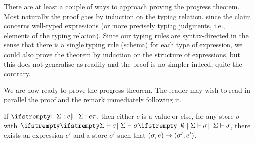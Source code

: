 There are at least a couple of ways to approach proving the progress theorem. Most naturally the proof goes by induction on the typing relation, since the claim concerns well-typed expressions (or more precisely typing judgments, i.e., elements of the typing relation). Since our typing rules are syntax-directed in the sense that there is a single typing rule (schema) for each type of expression, we could also prove the theorem by induction on the structure of expressions, but this does not generalise as readily and the proof is no simpler \textdash indeed, quite the contrary.

We are now ready to prove the progress theorem. The reader may wish to read in parallel the proof and the remark immediately following it.

\begin{theorem}[Progress]
    \label{thm:progress}
    If $\typerel{}{}{\Sigma}{e}{\tau}$, then either $e$ is a value or else, for any store $\sigma$ with $\stotype{}{}{\Sigma}{\sigma}$, there exists an expression $e'$ and a store $\sigma'$ such that $(\sigma,e) \to (\sigma',e')$.
\end{theorem}


